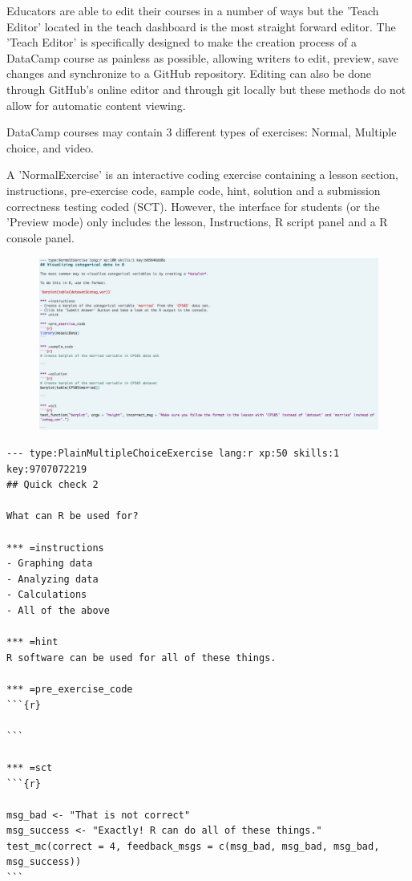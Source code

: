 \documentclass[12pt]{article}
\begin{document}
Educators are able to edit their courses in a number of ways but the 'Teach Editor' located in the teach dashboard is the
most straight forward editor. The 'Teach Editor' is specifically designed to make the creation process of a DataCamp course
as painless as possible, allowing writers to edit, preview, save changes and synchronize to a GitHub repository. Editing can
also be done through GitHub's online editor and through git locally but these methods do not allow for automatic content
viewing.



DataCamp courses may contain 3 different types of exercises: Normal, Multiple choice, and video.

A 'NormalExercise' is an interactive coding exercise containing a lesson section, instructions, pre-exercise code, sample
code, hint, solution and a submission correctness testing coded (SCT). However, the interface for students (or the 'Preview
mode) only includes the lesson, Instructions, R script panel and a R console panel.



\begin{figure}[h]
  \includegraphics[scale = 0.2] {edit.jpg}
\end{figure}

\begin{verbatim}
--- type:PlainMultipleChoiceExercise lang:r xp:50 skills:1 key:9707072219
## Quick check 2

What can R be used for?

*** =instructions
- Graphing data
- Analyzing data
- Calculations
- All of the above

*** =hint
R software can be used for all of these things.

*** =pre_exercise_code
```{r}

```

*** =sct
```{r}

msg_bad <- "That is not correct"
msg_success <- "Exactly! R can do all of these things."
test_mc(correct = 4, feedback_msgs = c(msg_bad, msg_bad, msg_bad, msg_success))
```



\end{verbatim}
\end{document}
